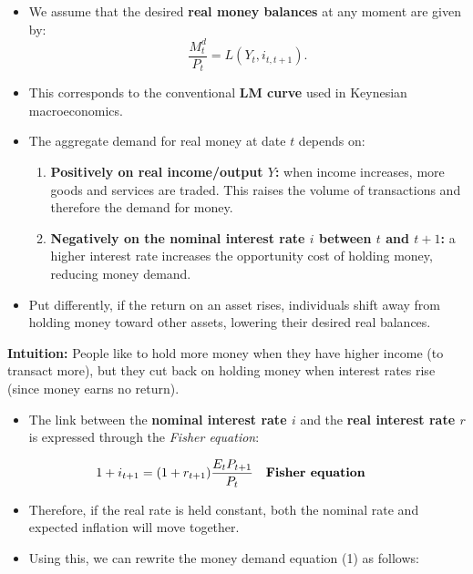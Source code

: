 \documentclass[12pt]{article}
\begin{document}
\begin{itemize}
    \item We assume that the desired \textbf{real money balances} at any moment are given by:
    \[
        \frac{M_t^d}{P_t} = L(Y_t, i_{t,t+1}).
    \]
    \item This corresponds to the conventional \textbf{LM curve} used in Keynesian macroeconomics.  
    \item The aggregate demand for real money at date $t$ depends on:  
    \begin{enumerate}
        \item \textbf{Positively on real income/output $Y$:} when income increases, more goods and services are traded. This raises the volume of transactions and therefore the demand for money.  
        \item \textbf{Negatively on the nominal interest rate $i$ between $t$ and $t+1$:} a higher interest rate increases the opportunity cost of holding money, reducing money demand.  
    \end{enumerate}
    \item Put differently, if the return on an asset rises, individuals shift away from holding money toward other assets, lowering their desired real balances.  
\end{itemize}

\textbf{Intuition:} People like to hold more money when they have higher income (to transact more), but they cut back on holding money when interest rates rise (since money earns no return).

\begin{itemize}
    \item The link between the \textbf{nominal interest rate $i$} and the \textbf{real interest rate $r$} is expressed through the \textit{Fisher equation}:  
\end{itemize}

\singlespacing
\begin{align}
1 + i_{t+1} &= (1 + r_{t+1}) \frac{E_t P_{t+1}}{P_t} && \text{\textbf{Fisher equation}}
\end{align}

\begin{itemize}
    \item Therefore, if the real rate is held constant, both the nominal rate and expected inflation will move together.  
    \item Using this, we can rewrite the money demand equation (1) as follows:  
\end{itemize}
\end{document}
